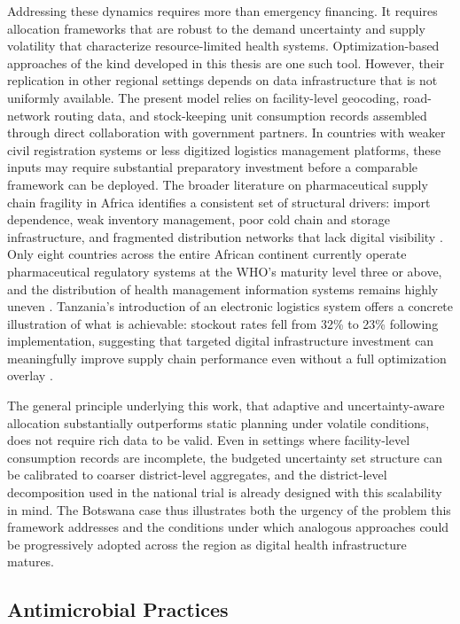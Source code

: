 \documentclass{article}
\begin{document}
Addressing these dynamics requires more than emergency financing. It requires allocation frameworks that are robust to the demand uncertainty and supply volatility that characterize resource-limited health systems. Optimization-based approaches of the kind developed in this thesis are one such tool. However, their replication in other regional settings depends on data infrastructure that is not uniformly available. The present model relies on facility-level geocoding, road-network routing data, and stock-keeping unit consumption records assembled through direct collaboration with government partners. In countries with weaker civil registration systems or less digitized logistics management platforms, these inputs may require substantial preparatory investment before a comparable framework can be deployed. The broader literature on pharmaceutical supply chain fragility in Africa identifies a consistent set of structural drivers: import dependence, weak inventory management, poor cold chain and storage infrastructure, and fragmented distribution networks that lack digital visibility \cite{olutuase2022}. Only eight countries across the entire African continent currently operate pharmaceutical regulatory systems at the WHO's maturity level three or above, and the distribution of health management information systems remains highly uneven \cite{duga2025}. Tanzania's introduction of an electronic logistics system offers a concrete illustration of what is achievable: stockout rates fell from 32\% to 23\% following implementation, suggesting that targeted digital infrastructure investment can meaningfully improve supply chain performance even without a full optimization overlay \cite{mwencha2016}.

The general principle underlying this work, that adaptive and uncertainty-aware allocation substantially outperforms static planning under volatile conditions, does not require rich data to be valid. Even in settings where facility-level consumption records are incomplete, the budgeted uncertainty set structure can be calibrated to coarser district-level aggregates, and the district-level decomposition used in the national trial is already designed with this scalability in mind. The Botswana case thus illustrates both the urgency of the problem this framework addresses and the conditions under which analogous approaches could be progressively adopted across the region as digital health infrastructure matures.

\subsection{Antimicrobial Practices}
\end{document}
